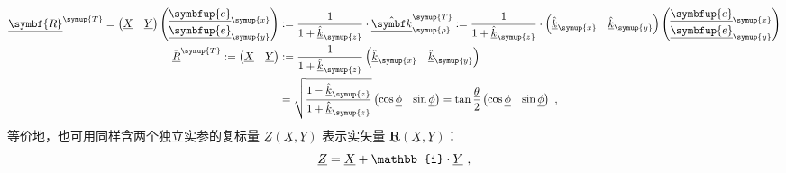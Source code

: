 \begin{subequations} \label{eq:2-55}
\abovedisplayskip=0pt
\begin{align}
	\underline{\symbf{R}}^{\symup{T}} = \begin{pmatrix} \underline{X} & \underline{Y} \end{pmatrix} \begin{pmatrix} \underline{\symbfup{e}}_{{\symup{x}}} \\ \underline{\symbfup{e}}_{{\symup{y}}} \end{pmatrix} &:= \frac{1}{1 + \hat{\underline{k}}_{\symup{z}}} \cdot \hat{\underline{\symbf k}}_{\symup{\rho}}^{\symup{T}} := \frac{1}{1 + \hat{\underline{k}}_{\symup{z}}} \cdot \begin{pmatrix} \hat{\underline{k}}_{\symup{x}} & \hat{\underline{k}}_{\symup{y}} \end{pmatrix} \begin{pmatrix} \underline{\symbfup{e}}_{{\symup{x}}} \\ \underline{\symbfup{e}}_{{\symup{y}}} \end{pmatrix}  \label{eq:2-55a}\\ \bar{\underline{R}}^{\symup{T}} := \begin{pmatrix} \underline{X} & \underline{Y} \end{pmatrix} &:= \frac{1}{1 + \hat{\underline{k}}_{\symup{z}}} \begin{pmatrix} \hat{\underline{k}}_{\symup{x}} & \hat{\underline{k}}_{\symup{y}} \end{pmatrix} \label{eq:2-55b}\\ &= \sqrt{\frac{1 - \hat{\underline{k}}_{\symup{z}}}{1 + \hat{\underline{k}}_{\symup{z}}}} \begin{pmatrix} \cos \underline{\phi} & \sin \underline{\phi} \end{pmatrix} = \tan \frac{ \underline{\theta} }{ 2 } \begin{pmatrix} \cos \underline{\phi} & \sin \underline{\phi} \end{pmatrix} \label{eq:2-55c} ~,
\end{align}
\end{subequations}
等价地，也可用同样含两个独立实参的复标量 $\underline{Z} \left(\underline{X},\underline{Y}\right)$ 表示实矢量 $\underline{\symbf{R}}\left(\underline{X},\underline{Y}\right)$：
\begin{equation} \label{eq:2-56}
	\abovedisplayskip=10pt
	\belowdisplayskip=10pt
	\underline{Z} = \underline{X} + \mathbb{i} \cdot \underline{Y} ~,
\end{equation}
